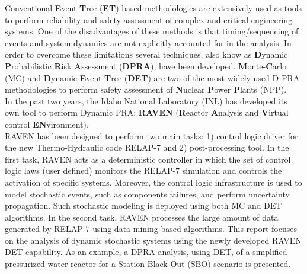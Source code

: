 
Conventional \textbf{E}vent-\textbf{T}ree (\textbf{ET}) based methodologies are extensively used as tools to perform reliability and safety assessment of complex and critical engineering systems. 
One of the disadvantages of these methods is that timing/sequencing of events and system dynamics are not explicitly accounted for in the analysis.
In order to overcome these limitations several techniques, also know as \textbf{D}ynamic \textbf{P}robabilistic \textbf{R}isk \textbf{A}ssessment (\textbf{DPRA}), have been developed. \textbf{M}onte-\textbf{C}arlo (MC) and \textbf{D}ynamic \textbf{E}vent \textbf{T}ree (\textbf{DET}) are two of the most widely used D-PRA methodologies to perform safety assessment of \textbf{N}uclear \textbf{P}ower \textbf{P}lants (NPP).
\\In the past two years, the Idaho National Laboratory (INL) has developed its own tool to perform Dynamic PRA: \textbf{RAVEN} (\textbf{R}eactor \textbf{A}nalysis and \textbf{V}irtual control \textbf{EN}vironment). 
\\RAVEN has been designed to perform two main tasks: 1) control logic driver for the new Thermo-Hydraulic code RELAP-7 and 2) post-processing tool.
In the first task, RAVEN acts as a deterministic controller in which the set of control logic laws (user defined) monitors the RELAP-7 simulation and controls the activation of specific systems.
Moreover, the control logic infrastructure is used to model stochastic events, such as components failures, and perform uncertainty propagation. Such stochastic modeling is deployed using both MC and DET algorithms. In the second task, RAVEN processes the large amount of data generated by RELAP-7 using data-mining based algorithms. This report focuses on the analysis of dynamic stochastic systems using the newly developed RAVEN DET capability. As an example, a DPRA analysis, using DET, of a simplified pressurized water reactor for a Station Black-Out (SBO) scenario is presented.

